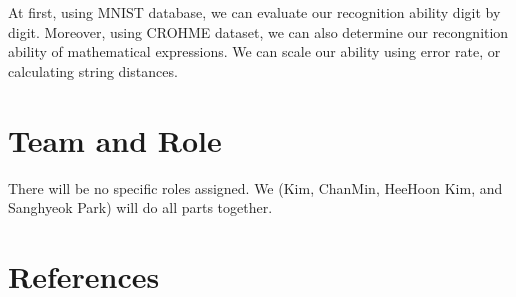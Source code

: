 \documentclass[10pt,twocolumn,letterpaper]{article}
\begin{document}
At first, using MNIST database, we can evaluate our recognition ability digit by digit.
Moreover, using CROHME dataset, we can also determine our recongnition ability of mathematical expressions.
We can scale our ability using error rate, or calculating string distances.

\section{Team and Role}

There will be no specific roles assigned. We (Kim, ChanMin, HeeHoon Kim, and Sanghyeok Park) will do all parts together.

\section{References}

{\small


}
\end{document}
